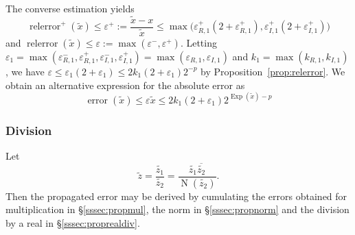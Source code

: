 \documentclass [11pt]{article}
\newcommand {\corr}[1]{{#1}}
\newcommand {\appro}[1]{\widetilde {#1}}
\DeclareMathOperator{\Exp}{\operatorname {Exp}}
\newcommand{\error}{\operatorname {error}}
\newcommand{\relerror}{\operatorname {relerror}}
\newcommand{\Norm}{\operatorname {N}}
\renewcommand {\epsilon}{\varepsilon}
\renewcommand {\leq}{\leqslant}
\begin{document}
The converse estimation yields
\begin {equation}
\label {eq:propnormepsplus}
\relerror^+ (\appro x)
\leq
\epsilon^+
:=
\frac {\appro x - \corr x}{\appro x}
\leq
\max \big(
   \epsilon_{R, 1}^+ (2 + \epsilon_{R, 1}^+),
   \epsilon_{I, 1}^+ (2 + \epsilon_{I, 1}^+)
\big)
\end {equation}
and $\relerror (\appro x) \leq \epsilon := \max (\epsilon^-, \epsilon^+)$.
Letting
$\epsilon_1 = \max ( \epsilon_{R, 1}^-, \epsilon_{R, 1}^+,
                     \epsilon_{I, 1}^-, \epsilon_{I, 1}^+ )
            = \max ( \epsilon_{R, 1},   \epsilon_{I, 1} )$
and $k_1 = \max ( k_{R, 1}, k_{I, 1})$,
we have
$\epsilon \leq \epsilon_1 (2 + \epsilon_1) \leq 2 k_1 (2 + \epsilon_1) 2^{-p}$
by Proposition~\ref {prop:relerror}.
We obtain an alternative expression for the absolute error as
\begin {equation}
\label {eq:propnormalt}
\error (\appro x) \leq \epsilon \appro x
\leq
2 k_1 (2 + \epsilon_1) 2^{\Exp (\appro x) - p}
\end {equation}


\subsubsection {Division}
\label{sssec:propdiv}

Let
\[
\appro z = \frac {\appro {z_1}}{\appro {z_2}}
= \frac {\appro {z_1} \overline {\appro {z_2}}}{\Norm (\appro {z_2})}.
\]
Then the propagated error may be derived by cumulating the errors obtained
for multiplication in \S\ref {sssec:propmul}, the norm in
\S\ref {sssec:propnorm} and the division by a real in
\S\ref {sssec:proprealdiv}.
\end{document}
